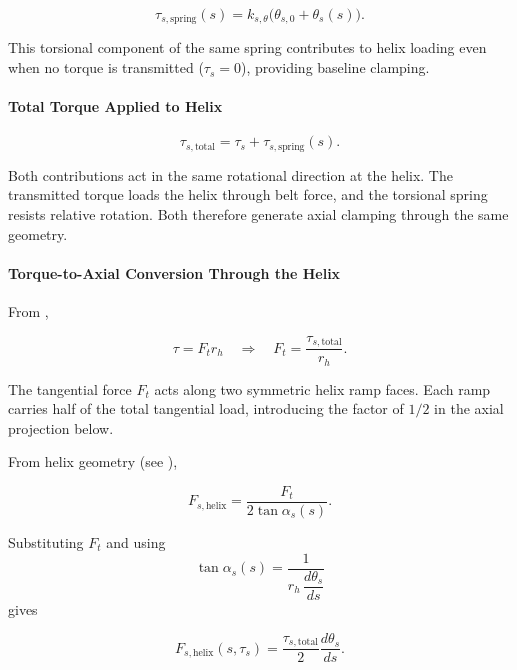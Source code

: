 \documentclass[11pt]{article}
\numberwithin{equation}{section}
\newcounter{theory}
\begin{document}
\begin{equation}
\tau_{s,\mathrm{spring}}(s)
=
k_{s,\theta}\big(\theta_{s,0}+\theta_s(s)\big).
\label{eq:secondary_torsion}
\end{equation}

This torsional component of the same spring contributes
to helix loading even when no torque is transmitted
($\tau_s = 0$), providing baseline clamping.

\paragraph{Total Torque Applied to Helix}

\begin{equation}
\tau_{s,\mathrm{total}}
=
\tau_s + \tau_{s,\mathrm{spring}}(s).
\label{eq:secondary_total_torque}
\end{equation}

Both contributions act in the same rotational direction at the helix.
The transmitted torque loads the helix through belt force,
and the torsional spring resists relative rotation.
Both therefore generate axial clamping through the same geometry.

\paragraph{Torque-to-Axial Conversion Through the Helix}

From ,

\[
\tau = F_t r_h
\quad\Rightarrow\quad
F_t = \frac{\tau_{s,\mathrm{total}}}{r_h}.
\]

The tangential force $F_t$ acts along two symmetric helix ramp faces.
Each ramp carries half of the total tangential load, introducing
the factor of $1/2$ in the axial projection below.

From helix geometry (see ),

\begin{equation}
F_{s,\mathrm{helix}}
=
\frac{F_t}{2\tan\alpha_s(s)}.
\label{eq:secondary_projection}
\end{equation}

Substituting $F_t$ and using
\[
\tan\alpha_s(s)
=
\frac{1}{r_h\,\dfrac{d\theta_s}{ds}}
\]
gives

\begin{equation}
F_{s,\mathrm{helix}}(s,\tau_s)
=
\frac{\tau_{s,\mathrm{total}}}{2}
\frac{d\theta_s}{ds}.
\label{eq:secondary_helix_force}
\end{equation}
\end{document}
